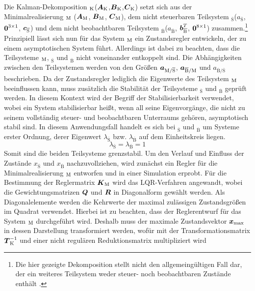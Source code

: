 Die Kalman-Dekomposition $_{\text{K}}$($\boldsymbol{A}_{\text{K}}$,$\boldsymbol{B}_{\text{K}}$,$\boldsymbol{C}_{\text{K}}$) setzt sich aus der Minimalrealisierung $_{\text{M}}$ ($\boldsymbol{A}_{\text{M}}$, $\boldsymbol{B}_{\text{M}}$, $\boldsymbol{C}_{\text{M}}$), dem nicht steuerbaren Teilsystem $_{\overline{\text{S}}}$($a_{\overline{\text{S}}}$, $\boldsymbol{0}^{3\times 1}$, $\boldsymbol{c}_{\overline{\text{S}}}$) und dem nicht beobachtbaren Teilsystem $_{\overline{\text{B}}}$($a_{\overline{\text{B}}}$, $\boldsymbol{b}^T_{\overline{\text{B}}}$, $\boldsymbol{0}^{8\times 1}$) zusammen.\footnote{Die hier gezeigte Dekomposition stellt nicht den allgemeingültigen Fall dar, der ein weiteres Teilsystem weder steuer- noch beobachtbaren Zustände enthält \cite[S. 108 ff.]{LunzeRT2}.} Prinzipiell lässt sich nun für das System $_{\text{M}}$ ein Zustandsregler entwickeln, der zu einem asymptotischen System führt. Allerdings ist dabei zu beachten, dass die Teilsysteme $_{\text{M}}$, $_{\overline{\text{S}}}$ und $_{\overline{\text{B}}}$ nicht voneinander entkoppelt sind. Die Abhängigkeiten zwischen den Teilsystemen werden von den Größen $\boldsymbol{a}_{\text{M}/\overline{\text{S}}}$, $\boldsymbol{a}_{\overline{\text{B}}/\text{M}}$ und $a_{\overline{\text{B}}/\overline{\text{S}}}$ beschrieben. Da der Zustandsregler lediglich die Eigenwerte des Teilsystem $_{\text{M}}$ beeinflussen kann, muss zusätzlich die Stabilität der Teilsysteme $_{\overline{\text{S}}}$ und $_{\overline{\text{B}}}$ geprüft werden. In diesem Kontext wird der Begriff der Stabilisierbarkeit verwendet, wobei ein System stabilisierbar heißt, wenn all seine Eigenvorgänge, die nicht zu seinem vollständig steuer- und beobachtbaren Unterraums gehören, asymptotisch stabil sind. In diesem Anwendungsfall handelt es sich bei $_{\overline{\text{S}}}$ und $_{\overline{\text{B}}}$ um Systeme erster Ordnung, derer Eigenwert $\lambda_{\overline{\text{S}}}$ bzw. $\lambda_{\overline{\text{B}}}$ auf dem Einheitskreis liegen.
\begin{equation}
\lambda_{\overline{\text{S}}} = \lambda_{\overline{\text{B}}} = 1
\end{equation}
Somit sind die beiden Teilsysteme grenzstabil. Um den Verlauf und Einfluss der Zustände $x_{\overline{\text{S}}}$ und $x_{\overline{\text{B}}}$ nachzuvollziehen, wird zunächst ein Regler für die Minimalrealisierung $_{\text{M}}$ entworfen und in einer Simulation erprobt. Für die Bestimmung der Reglermatrix $\boldsymbol{K}_{\text{M}}$ wird das LQR-Verfahren angewandt, wobei die Gewichtungsmatrizen $\boldsymbol{Q}$ und $\boldsymbol{R}$ in Diagonalform gewählt werden. Als Diagonalelemente werden die Kehrwerte der maximal zulässigen Zustandsgrößen im Quadrat verwendet. Hierbei ist zu beachten, dass der Reglerentwurf für das System $_{\text{M}}$ durchgeführt wird. Deshalb muss der maximale Zustandsvektor $\boldsymbol{x}_{\text{max}}$ in dessen Darstellung transformiert werden, wofür mit der Transformationsmatrix $\boldsymbol{T}^{-1}_{\text{K}}$ und einer nicht regulären Reduktionsmatrix multipliziert wird
